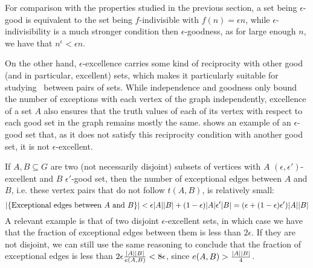         \begin{remark}
            For comparison with the properties studied in the previous section, a set being $\epsilon$-good is equivalent to the
            set being $f$-indivisible with $f(n) = \epsilon n$, while $\epsilon$-indivisibility is a much stronger condition then
            $\epsilon$-goodness, as for large enough $n$, we have that $n^\epsilon < \epsilon n$.

            On the other hand, $\epsilon$-excellence carries some kind of reciprocity with other good (and in particular,
            excellent) sets, which makes it particularly suitable for studying \regularity~between pairs of sets.
            While independence and goodness only bound the number of exceptions with each vertex of the graph independently,
            excellence of a set $A$ also ensures that the truth values of each of its vertex with respect to each
            good set in the graph remains mostly the same.
             shows an example of an $\epsilon$-good set that, as it does not satisfy this
            reciprocity condition with another good set, it is not $\epsilon$-excellent.
        \end{remark}

        \begin{remark} \label{rmk:excellence_imply_little_exceptions}
            If $A, B \subseteq G$ are two (not necessarily disjoint) subsets of vertices
            with $A$ $(\epsilon, \epsilon')$-excellent and $B$ $\epsilon'$-good set, then the number of exceptional edges between $A$ and $B$,
            i.e. these vertex pairs that do not follow $t(A,B)$, is relatively small:
            \[
                | \{ \text{Exceptional edges between } A \text{ and } B \} | <
                    \epsilon |A| |B| + (1- \epsilon) |A| \epsilon' |B| = ( \epsilon + ( 1-\epsilon ) \epsilon' ) |A| |B|
            \]
            A relevant example is that of two disjoint $\epsilon$-excellent sets, in which case we have that the fraction
            of exceptional edges between them is less than $2\epsilon$.
            If they are not disjoint, we can still use the same reasoning to conclude that the fraction of exceptional edges
            is less than $2 \epsilon \frac{| A | | B |}{e(A,B)} < 8 \epsilon$, since
            $e(A,B) > \frac{| A | | B |}{4}$.
        \end{remark}

